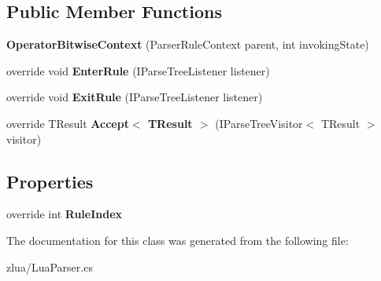 \subsection*{Public Member Functions}
\begin{DoxyCompactItemize}
\item 
\mbox{\label{classzlua_1_1_lua_parser_1_1_operator_bitwise_context_a9cac1d8c2e8b4ea4e1f0fbfa32cd053d}} 
{\bfseries Operator\+Bitwise\+Context} (Parser\+Rule\+Context parent, int invoking\+State)
\item 
\mbox{\label{classzlua_1_1_lua_parser_1_1_operator_bitwise_context_ac8b761c5454fa4ac0dc8e60221b84eac}} 
override void {\bfseries Enter\+Rule} (I\+Parse\+Tree\+Listener listener)
\item 
\mbox{\label{classzlua_1_1_lua_parser_1_1_operator_bitwise_context_ae428d67143e4912c88873b910f919641}} 
override void {\bfseries Exit\+Rule} (I\+Parse\+Tree\+Listener listener)
\item 
\mbox{\label{classzlua_1_1_lua_parser_1_1_operator_bitwise_context_a3ec0ef03aaed666a961132562020266c}} 
override T\+Result {\bfseries Accept$<$ T\+Result $>$} (I\+Parse\+Tree\+Visitor$<$ T\+Result $>$ visitor)
\end{DoxyCompactItemize}
\subsection*{Properties}
\begin{DoxyCompactItemize}
\item 
\mbox{\label{classzlua_1_1_lua_parser_1_1_operator_bitwise_context_a7a2309e4194d035f83d5230c171f6d6f}} 
override int {\bfseries Rule\+Index}
\end{DoxyCompactItemize}


The documentation for this class was generated from the following file\+:\begin{DoxyCompactItemize}
\item 
zlua/Lua\+Parser.\+cs\end{DoxyCompactItemize}
